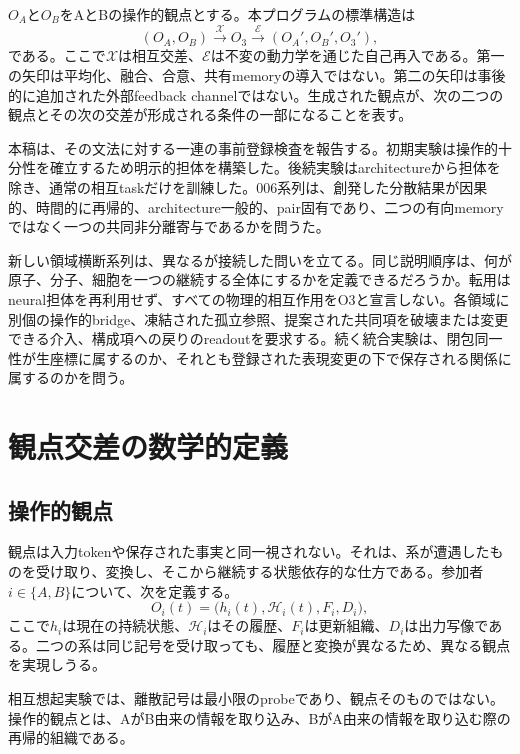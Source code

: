 \documentclass[11pt,a4paper]{article}
\newcommand{\OA}{\ensuremath{O_{A}}}
\newcommand{\OB}{\ensuremath{O_{B}}}
\newcommand{\Othree}{\ensuremath{O_{3}}}
\begin{document}
\OA と\OB をAとBの操作的観点とする。本プログラムの標準構造は
\begin{equation}
 (\OA,\OB)
 \xrightarrow{\mathcal X}
 \Othree
 \xrightarrow{\mathcal E}
 (\OA',\OB',\Othree'),
 \label{eq:canonical}
\end{equation}
である。ここで$\mathcal X$は相互交差、$\mathcal E$は不変の動力学を通じた自己再入である。第一の矢印は平均化、融合、合意、共有memoryの導入ではない。第二の矢印は事後的に追加された外部feedback channelではない。生成された観点が、次の二つの観点とその次の交差が形成される条件の一部になることを表す。

本稿は、その文法に対する一連の事前登録検査を報告する。初期実験は操作的十分性を確立するため明示的担体を構築した。後続実験はarchitectureから担体を除き、通常の相互taskだけを訓練した。006系列は、創発した分散結果が因果的、時間的に再帰的、architecture一般的、pair固有であり、二つの有向memoryではなく一つの共同非分離寄与であるかを問うた。

新しい領域横断系列は、異なるが接続した問いを立てる。同じ説明順序は、何が原子、分子、細胞を一つの継続する全体にするかを定義できるだろうか。転用はneural担体を再利用せず、すべての物理的相互作用をO3と宣言しない。各領域に別個の操作的bridge、凍結された孤立参照、提案された共同項を破壊または変更できる介入、構成項への戻りのreadoutを要求する。続く統合実験は、閉包同一性が生座標に属するのか、それとも登録された表現変更の下で保存される関係に属するのかを問う。

\section{観点交差の数学的定義}

\subsection{操作的観点}

観点は入力tokenや保存された事実と同一視されない。それは、系が遭遇したものを受け取り、変換し、そこから継続する状態依存的な仕方である。参加者$i\in\{A,B\}$について、次を定義する。
\begin{equation}
 O_i(t)=\bigl(h_i(t),\mathcal H_i(t),F_i,D_i\bigr),
 \label{eq:perspective}
\end{equation}
ここで$h_i$は現在の持続状態、$\mathcal H_i$はその履歴、$F_i$は更新組織、$D_i$は出力写像である。二つの系は同じ記号を受け取っても、履歴と変換が異なるため、異なる観点を実現しうる。

相互想起実験では、離散記号は最小限のprobeであり、観点そのものではない。操作的観点とは、AがB由来の情報を取り込み、BがA由来の情報を取り込む際の再帰的組織である。
\end{document}
